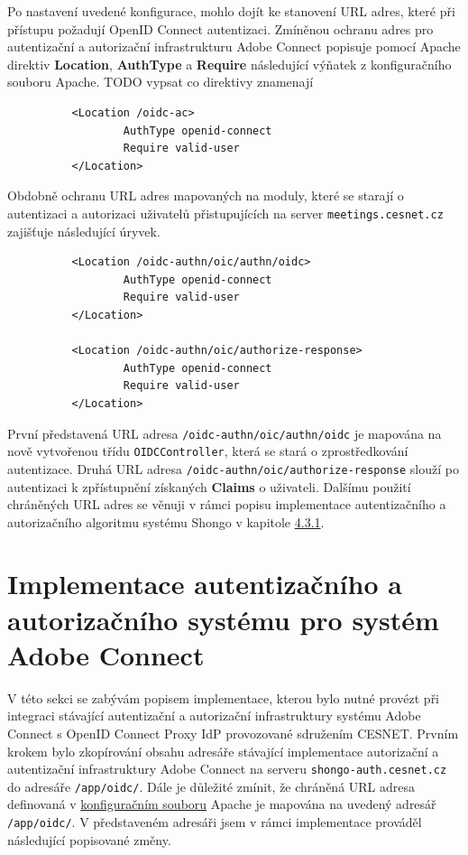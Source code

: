 \documentclass[
  printed, %
  twoside, %
  table,   %
  nolof,     %
  nolot,     %
]{fithesis3}
\begin{document}
Po nastavení uvedené konfigurace, mohlo dojít ke stanovení URL adres, které při přístupu požadují OpenID Connect autentizaci. Zmíněnou ochranu adres pro autentizační a autorizační infrastrukturu Adobe Connect popisuje pomocí Apache direktiv \textbf{Location}, \textbf{AuthType} a \textbf{Require} následující výňatek z konfiguračního souboru Apache.
TODO vypsat co direktivy znamenají
\begin{lstlisting}
          <Location /oidc-ac>
                  AuthType openid-connect
                  Require valid-user
          </Location>
\end{lstlisting}
\label{ac-location}

Obdobně ochranu URL adres mapovaných na moduly, které se starají o autentizaci a autorizaci uživatelů přistupujících na server \texttt{meetings.cesnet.cz} zajišťuje následující úryvek. 

\begin{lstlisting}
          <Location /oidc-authn/oic/authn/oidc>
                  AuthType openid-connect
                  Require valid-user
          </Location>
          
          <Location /oidc-authn/oic/authorize-response>
                  AuthType openid-connect
                  Require valid-user
          </Location>
\end{lstlisting}
První představená URL adresa \texttt{/oidc-authn/oic/authn/oidc} je mapována na nově vytvořenou třídu \texttt{OIDCController}, která se stará o zprostředkování autentizace. Druhá URL adresa \texttt{/oidc-authn/oic/authorize-response} slouží po autentizaci k zpřístupnění získaných \textbf{Claims} o uživateli. Dalšímu použití  chráněných URL adres se věnuji v rámci popisu implementace autentizačního a autorizačního algoritmu systému Shongo v kapitole \hyperref[ShongoImpl-authn]{4.3.1}.

\label{shongo-location}

\section{Implementace autentizačního a autorizačního systému pro systém Adobe Connect}
\label{ACImpl}
V této sekci se zabývám popisem implementace, kterou bylo nutné provézt při integraci stávající autentizační a autorizační infrastruktury systému Adobe Connect s OpenID Connect Proxy IdP provozované sdružením CESNET. Prvním krokem bylo zkopírování obsahu adresáře stávající implementace autorizační a autentizační infrastruktury Adobe Connect na serveru \texttt{shongo-auth.cesnet.cz} do adresáře \texttt{/app/oidc/}. Dále je důležité zmínit, že chráněná URL adresa definovaná v \hyperref[ac-location]{konfiguračním souboru} Apache je mapována na uvedený adresář \texttt{/app/oidc/}. V představeném adresáři jsem v rámci implementace prováděl následující popisované změny. \par
\end{document}
